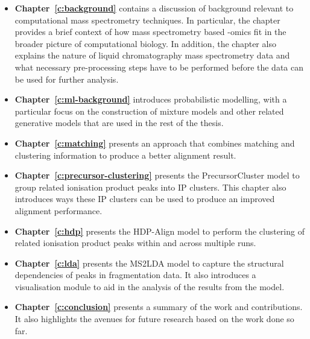 \begin{itemize}
\item \textbf{Chapter~\ref{c:background}} contains a discussion of background relevant to computational mass spectrometry techniques. In particular, the chapter provides a brief context of how mass spectrometry based -omics fit in the broader picture of computational biology. In addition, the chapter also explains the nature of liquid chromatography mass spectrometry data and what necessary pre-processing steps have to be performed before the data can be used for further analysis.
\item \textbf{Chapter~\ref{c:ml-background}} introduces probabilistic modelling, with a particular focus on the construction of mixture models and other related generative models that are used in the rest of the thesis.
\item \textbf{Chapter~\ref{c:matching}} presents an approach that combines matching and clustering information to produce a better alignment result.
\item \textbf{Chapter~\ref{c:precursor-clustering}} presents the PrecursorCluster model to group related ionisation product peaks into IP clusters. This chapter also introduces ways these IP clusters can be used to produce an improved alignment performance.
\item \textbf{Chapter~\ref{c:hdp}} presents the HDP-Align model to perform the clustering of related ionisation product peaks within and across multiple runs. 
\item \textbf{Chapter~\ref{c:lda}} presents the MS2LDA model to capture the structural dependencies of peaks in fragmentation data. It also introduces a visualisation module to aid in the analysis of the results from the model. 
\item \textbf{Chapter~\ref{c:conclusion}} presents a summary of the work and contributions. It also highlights the avenues for future research based on the work done so far. 
\end{itemize}
